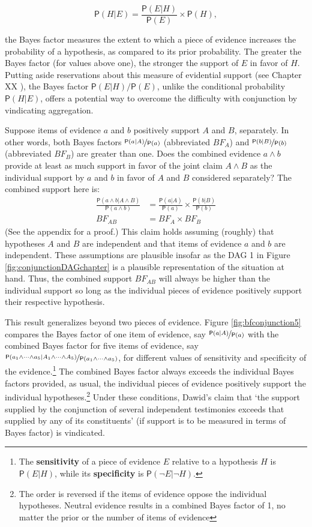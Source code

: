 \documentclass[
  10pt,
  dvipsnames,enabledeprecatedfontcommands]{scrartcl}
\newcommand{\pr}[1]{\ensuremath{\mathsf{P}(#1)}}
\begin{document}
\[\pr{H \vert E} = \frac{\pr{E \vert H}}{\pr{E}}\times \pr{H},\]

\noindent the Bayes factor measures the extent to which a piece of
evidence increases the probability of a hypothesis, as compared to its
prior probability. The greater the Bayes factor (for values above one),
the stronger the support of \(E\) in favor of \(H\). Putting aside
reservations about this measure of evidential support (see Chapter XX
), the Bayes factor
\(\pr{E \vert H}/\pr{E}\), unlike the conditional probability
\(\pr{H \vert E}\), offers a potential way to overcome the difficulty
with conjunction by vindicating aggregation.

Suppose items of evidence \(a\) and \(b\) positively support \(A\) and
\(B\), separately. In other words, both Bayes factors
\(\nicefrac{\pr{a \vert A}}{\pr{a}}\) (abbreviated \(BF_A\)) and
\(\nicefrac{\pr{b \vert B}}{\pr{b}}\) (abbreviated \(BF_B\)) are greater
than one. Does the combined evidence \(a \wedge b\) provide at least as
much support in favor of the joint claim \(A \wedge B\) as the
individual support by \(a\) and \(b\) in favor of \(A\) and \(B\)
considered separately? The combined support here is: \begin{align*}
\frac{\pr{a \wedge b \vert A \wedge B}}{\pr{a \wedge b}} &= \frac{\pr{a \vert A}}{\pr{a}} \times \frac{\pr{b \vert B}}{\pr{b}}\\
BF_{AB} &= BF_{A} \times BF_{B}
\end{align*} \noindent (See the appendix for a proof.) This claim holds
assuming (roughly) that hypotheses \(A\) and \(B\) are independent and
that items of evidence \(a\) and \(b\) are independent. These
assumptions are plausible insofar as the \textsf{DAG 1} in Figure
\ref{fig:conjunctionDAGchapter} is a plausible representation of the
situation at hand. Thus, the combined support \(BF_{AB}\) will always be
higher than the individual support so long as the individual pieces of
evidence positively support their respective hypothesis.

This result generalizes beyond two pieces of evidence. Figure
\ref{fig:bfconjunction5} compares the Bayes factor of one item of
evidence, say \(\nicefrac{\pr{a \vert A}}{\pr{a}}\) with the combined
Bayes factor for five items of evidence, say
\(\nicefrac{\pr{a_1 \wedge \dots \wedge a_5 \vert A_1 \wedge \dots \wedge A_5}}{\pr{a_1\wedge \dots \wedge a_5}}\),
for different values of sensitivity and specificity of the
evidence.\footnote{The \textbf{sensitivity} of a piece of evidence \(E\)
  relative to a hypothesis \(H\) is \(\pr{E \vert H}\), while its
  \textbf{specificity} is \(\pr{\neg E \vert \neg H}\).} The combined
Bayes factor always exceeds the individual Bayes factors provided, as
usual, the individual pieces of evidence positively support the
individual hypotheses.\footnote{The order is reversed if the items of
  evidence oppose the individual hypotheses. Neutral evidence results in
  a combined Bayes factor of 1, no matter the prior or the number of
  items of evidence} Under these conditions, Dawid's claim that `the
support supplied by the conjunction of several independent testimonies
exceeds that supplied by any of its constituents' (if support is to be
measured in terms of Bayes factor) is vindicated.
\end{document}
